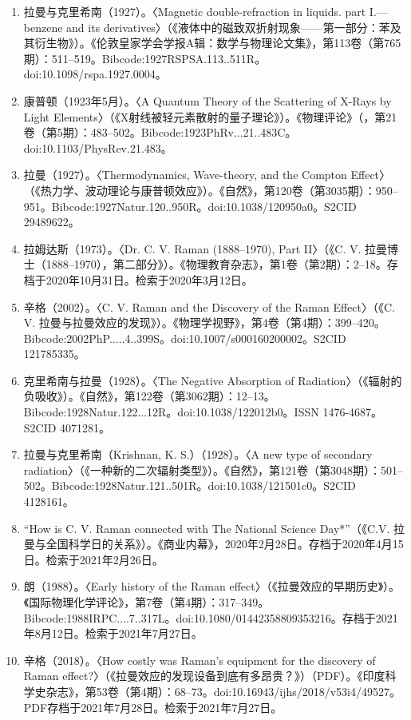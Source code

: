 \begin{enumerate}
\item 拉曼与克里希南（1927）。〈Magnetic double-refraction in liquids. part I.—benzene and its derivatives〉（《液体中的磁致双折射现象——第一部分：苯及其衍生物》）。《伦敦皇家学会学报A辑：数学与物理论文集》，第113卷（第765期）：511–519。Bibcode:1927RSPSA.113..511R。doi:10.1098/rspa.1927.0004。
\item 康普顿（1923年5月）。〈A Quantum Theory of the Scattering of X-Rays by Light Elements〉（《X射线被轻元素散射的量子理论》）。《物理评论》（，第21卷（第5期）：483–502。Bibcode:1923PhRv...21..483C。doi:10.1103/PhysRev.21.483。
\item 拉曼（1927）。〈Thermodynamics, Wave-theory, and the Compton Effect〉（《热力学、波动理论与康普顿效应》）。《自然》，第120卷（第3035期）：950–951。Bibcode:1927Natur.120..950R。doi:10.1038/120950a0。S2CID 29489622。
\item 拉姆达斯（1973）。〈Dr. C. V. Raman (1888–1970), Part II〉（《C. V. 拉曼博士（1888–1970），第二部分》）。《物理教育杂志》，第1卷（第2期）：2–18。存档于2020年10月31日。检索于2020年3月12日。
\item 辛格（2002）。〈C. V. Raman and the Discovery of the Raman Effect〉（《C. V. 拉曼与拉曼效应的发现》）。《物理学视野》，第4卷（第4期）：399–420。Bibcode:2002PhP.....4..399S。doi:10.1007/s000160200002。S2CID 121785335。
\item 克里希南与拉曼（1928）。〈The Negative Absorption of Radiation〉（《辐射的负吸收》）。《自然》，第122卷（第3062期）：12–13。Bibcode:1928Natur.122...12R。doi:10.1038/122012b0。ISSN 1476-4687。S2CID 4071281。
\item 拉曼与克里希南（Krishnan, K. S.）（1928）。〈A new type of secondary radiation〉（《一种新的二次辐射类型》）。《自然》，第121卷（第3048期）：501–502。Bibcode:1928Natur.121..501R。doi:10.1038/121501c0。S2CID 4128161。
\item “How is C. V. Raman connected with The National Science Day*”（《C.V. 拉曼与全国科学日的关系》）。《商业内幕》，2020年2月28日。存档于2020年4月15日。检索于2021年2月26日。
\item 朗（1988）。〈Early history of the Raman effect〉（《拉曼效应的早期历史》）。《国际物理化学评论》，第7卷（第4期）：317–349。Bibcode:1988IRPC....7..317L。doi:10.1080/01442358809353216。存档于2021年8月12日。检索于2021年7月27日。
\item 辛格（2018）。〈How costly was Raman's equipment for the discovery of Raman effect?〉（《拉曼效应的发现设备到底有多昂贵？》）（PDF）。《印度科学史杂志》，第53卷（第4期）：68–73。doi:10.16943/ijhs/2018/v53i4/49527。PDF存档于2021年7月28日。检索于2021年7月27日。

\end{enumerate}
